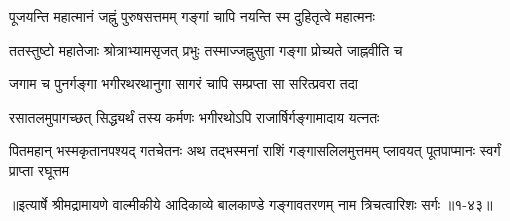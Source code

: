 \twolineshloka
{पूजयन्ति महात्मानं जह्नुं पुरुषसत्तमम्}
{गङ्गां चापि नयन्ति स्म दुहितृत्वे महात्मनः} %

\twolineshloka
{ततस्तुष्टो महातेजाः श्रोत्राभ्यामसृजत् प्रभुः}
{तस्माज्जह्नुसुता गङ्गा प्रोच्यते जाह्नवीति च} %

\twolineshloka
{जगाम च पुनर्गङ्गा भगीरथरथानुगा}
{सागरं चापि सम्प्रप्ता सा सरित्प्रवरा तदा} %

\twolineshloka
{रसातलमुपागच्छत् सिद्ध्यर्थं तस्य कर्मणः}
{भगीरथोऽपि राजार्षिर्गङ्गामादाय यत्नतः} %

\threelineshloka
{पितमहान् भस्मकृतानपश्यद् गतचेतनः}
{अथ तद्भस्मनां राशिं गङ्गासलिलमुत्तमम्}
{प्लावयत् पूतपाप्मानः स्वर्गं प्राप्ता रघूत्तम} %


॥इत्यार्षे श्रीमद्रामायणे वाल्मीकीये आदिकाव्ये बालकाण्डे गङ्गावतरणम् नाम त्रिचत्वारिशः सर्गः ॥१-४३॥
